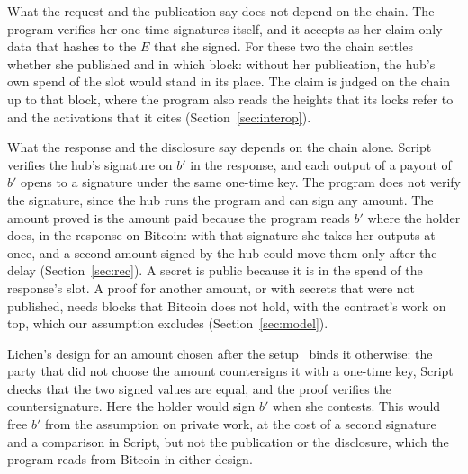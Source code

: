 \documentclass[11pt]{article}
\newcommand{\bresp}{b'}
\begin{document}
What the request and the publication say does not depend on the chain. The program verifies her one-time signatures itself, and it accepts as her claim only data that hashes to the $E$ that she signed. For these two the chain settles whether she published and in which block: without her publication, the hub's own spend of the slot would stand in its place. The claim is judged on the chain up to that block, where the program also reads the heights that its locks refer to and the activations that it cites (Section~\ref{sec:interop}).

What the response and the disclosure say depends on the chain alone. Script verifies the hub's signature on $\bresp$ in the response, and each output of a payout of $\bresp$ opens to a signature under the same one-time key. The program does not verify the signature, since the hub runs the program and can sign any amount. The amount proved is the amount paid because the program reads $\bresp$ where the holder does, in the response on Bitcoin: with that signature she takes her outputs at once, and a second amount signed by the hub could move them only after the delay (Section~\ref{sec:rec}). A secret is public because it is in the spend of the response's slot. A proof for another amount, or with secrets that were not published, needs blocks that Bitcoin does not hold, with the contract's work on top, which our assumption excludes (Section~\ref{sec:model}).

Lichen's design for an amount chosen after the setup~\cite{delving} binds it otherwise: the party that did not choose the amount countersigns it with a one-time key, Script checks that the two signed values are equal, and the proof verifies the countersignature. Here the holder would sign $\bresp$ when she contests. This would free $\bresp$ from the assumption on private work, at the cost of a second signature and a comparison in Script, but not the publication or the disclosure, which the program reads from Bitcoin in either design.
\end{document}

